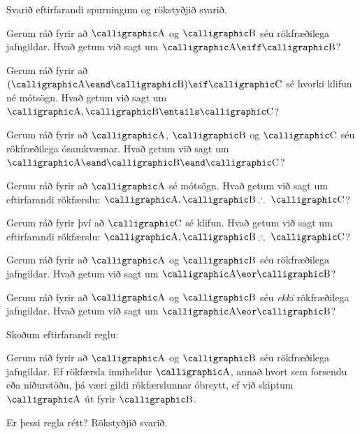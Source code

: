 \problempart
Svarið eftirfarandi spurningum og rökstyðjið svarið.
\begin{earg}

\item Gerum ráð fyrir að $\meta{A}$ og $\meta{B}$ séu rökfræðilega jafngildar. Hvað getum við sagt um $\meta{A} \eiff \meta{B}$?

\item Gerum ráð fyrir að $(\meta{A} \eand \meta{B}) \eif \meta{C}$ sé hvorki klifun né mótsögn. Hvað getum við sagt um $\meta{A}, \meta{B} \entails \meta{C}$?

\item Gerum ráð fyrir að $\meta{A}$, $\meta{B}$ og $\meta{C}$ séu rökfræðilega ósamkvæmar. Hvað getum við sagt um $\meta{A} \eand \meta{B} \eand\meta{C}$?

\item Gerum ráð fyrir að $\meta{A}$ sé mótsögn. Hvað getum við sagt um eftirfarandi rökfærslu: $\meta{A}, \meta{B} \therefore~\meta{C}$?

\item Gerum ráð fyrir því að $\meta{C}$ sé klifun. Hvað getum við sagt um eftirfarandi rökfærslu: $\meta{A}, \meta{B} \therefore~\meta{C}$?

\item Gerum ráð fyrir að $\meta{A}$ og $\meta{B}$ séu rökfræðilega jafngildar. Hvað getum við sagt um $\meta{A} \eor \meta{B}$?

\item Gerum ráð fyrir að $\meta{A}$ og $\meta{B}$ séu \emph{ekki} rökfræðilega jafngildar. Hvað getum við sagt um $\meta{A} \eor \meta{B}$?
\end{earg}
\problempart 
Skoðum eftirfarandi reglu:
	\begin{ebullet}
		\item Gerum ráð fyrir að $\meta{A}$ og $\meta{B}$ séu rökfræðilega jafngildar. Ef rökfærsla inniheldur $\meta{A}$, annað hvort sem forsendu eða niðurstöðu, þá væri gildi rökfærslunnar óbreytt, ef við skiptum $\meta{A}$ út fyrir $\meta{B}$.
	\end{ebullet}
Er þessi regla rétt? Rökstyðjið svarið.

